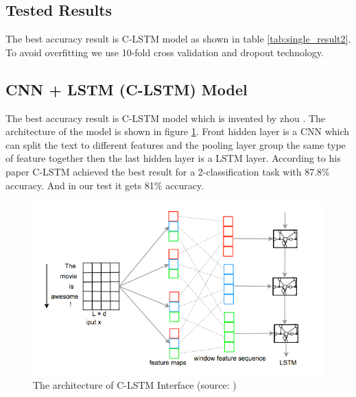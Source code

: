   \subsection{Tested Results}  
  The best accuracy result is C-LSTM model as shown in table \ref{tab:single_result2}. To avoid overfitting we use 10-fold cross validation and dropout technology.  
  
 \begin{table}[!h]
 \centering
{}
 \caption{Prediction Accuracy of Different Single Tweet's Creditability Scoring Models }
 \label{tab:single_result2}
\end{table}

\newpage
  \subsection{CNN + LSTM (C-LSTM) Model}  
  The best accuracy result is C-LSTM model which is invented by zhou \cite{zhou2015c}. The architecture of the model is shown in figure \ref{fig:CNNLSTMde}. Front hidden layer is a CNN which can split the text to different features and the pooling layer group the same type of feature together then the last hidden layer is a LSTM layer. According to his paper C-LSTM achieved the best result for a 2-classification task with 87.8\% accuracy. And in our test it gets 81\% accuracy. 
  
  \begin{figure}
\centering
\includegraphics[width=0.8\columnwidth]{images/CNNLSTMdetail.png}
\caption{The architecture of C-LSTM Interface (source: \cite{zhou2015c})}
\label{fig:CNNLSTMde}
\end{figure} 

